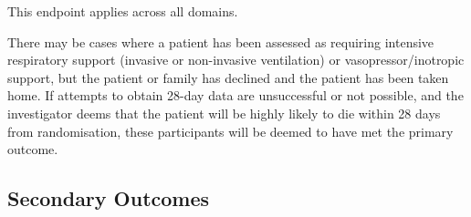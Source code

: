 \documentclass[
  11pt,
]{article}
\begin{document}
This endpoint applies across all domains.

There may be cases where a patient has been assessed as requiring intensive respiratory support (invasive or non-invasive ventilation) or vasopressor/inotropic support, but the patient or family has declined and the patient has been taken home.
If attempts to obtain 28-day data are unsuccessful or not possible, and the investigator deems that the patient will be highly likely to die within 28 days from randomisation, these participants will be deemed to have met the primary outcome.

\hypertarget{secondary-outcomes}{%
\subsection{Secondary Outcomes}\label{secondary-outcomes}}
\end{document}
